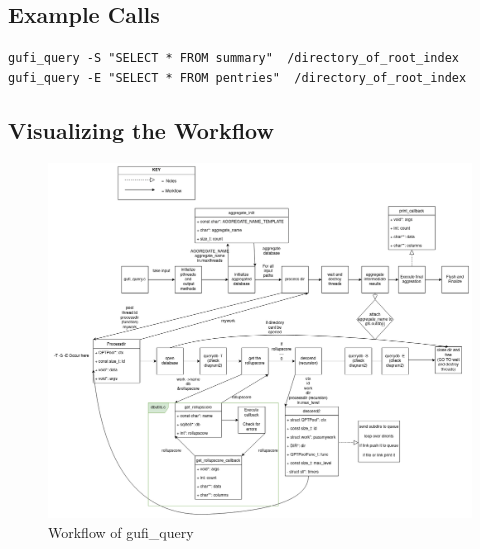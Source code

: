 \clearpage

\subsection{Example Calls}

\texttt{gufi\_query -S "SELECT * FROM summary" ~/directory\_of\_root\_index}
\\
\texttt{gufi\_query -E "SELECT * FROM pentries" ~/directory\_of\_root\_index}

\subsection{Visualizing the Workflow}
\begin{figure} [h]
\centering
\includegraphics[width=1.0\textwidth]{images/gufi_query.png}
\caption{\label{fig:gufi_query}Workflow of gufi\_query}
\end{figure}
